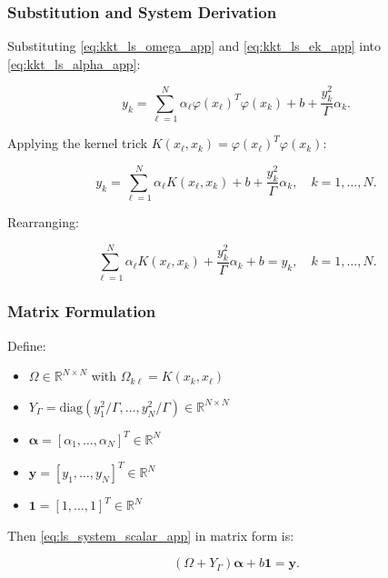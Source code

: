 \documentclass[mathematics,article,submit,pdftex,moreauthors]{Definitions/mdpi}
\begin{document}
\subsubsection{Substitution and System Derivation}

Substituting \eqref{eq:kkt_ls_omega_app} and \eqref{eq:kkt_ls_ek_app} into \eqref{eq:kkt_ls_alpha_app}:
\begin{linenomath}
\begin{equation}
y_k = \sum_{\ell=1}^N \alpha_\ell \varphi(x_\ell)^T\varphi(x_k) + b + \frac{y_k^2}{\Gamma}\alpha_k.
\end{equation}
\end{linenomath}

Applying the kernel trick $K(x_\ell, x_k) = \varphi(x_\ell)^T\varphi(x_k)$:
\begin{linenomath}
\begin{equation}\label{eq:ls_system_scalar_app}
y_k = \sum_{\ell=1}^N \alpha_\ell K(x_\ell, x_k) + b + \frac{y_k^2}{\Gamma}\alpha_k, \quad k=1,\ldots,N.
\end{equation}
\end{linenomath}

Rearranging:
\begin{linenomath}
\begin{equation}
\sum_{\ell=1}^N \alpha_\ell K(x_\ell, x_k) + \frac{y_k^2}{\Gamma}\alpha_k + b = y_k, \quad k=1,\ldots,N.
\end{equation}
\end{linenomath}

\subsubsection{Matrix Formulation}

Define:
\begin{itemize}
\item $\Omega \in \mathbb{R}^{N \times N}$ with $\Omega_{k\ell} = K(x_k, x_\ell)$
\item $Y_\Gamma = \mathrm{diag}(y_1^2/\Gamma, \ldots, y_N^2/\Gamma) \in \mathbb{R}^{N \times N}$
\item $\boldsymbol{\alpha} = [\alpha_1, \ldots, \alpha_N]^T \in \mathbb{R}^N$
\item $\mathbf{y} = [y_1, \ldots, y_N]^T \in \mathbb{R}^N$
\item $\mathbf{1} = [1, \ldots, 1]^T \in \mathbb{R}^N$
\end{itemize}

Then \eqref{eq:ls_system_scalar_app} in matrix form is:
\begin{linenomath}
\begin{equation}
(\Omega + Y_\Gamma)\boldsymbol{\alpha} + b\mathbf{1} = \mathbf{y}.
\end{equation}
\end{linenomath}
\end{document}
